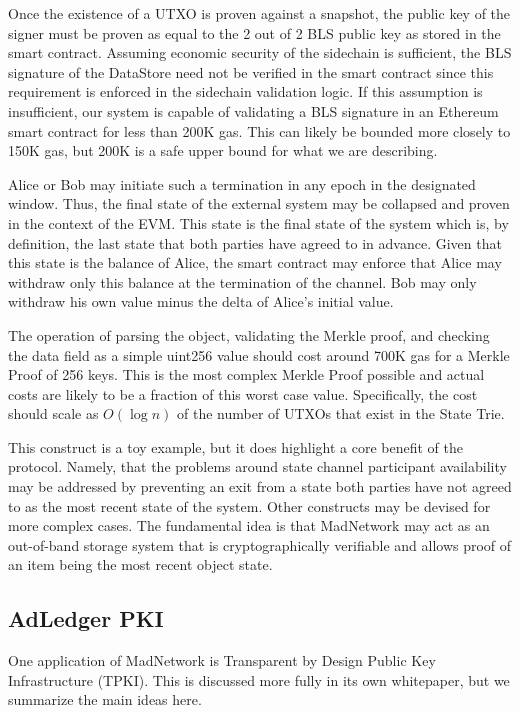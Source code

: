Once the existence of a UTXO is proven against a snapshot, the public
key of the signer must be proven as equal to the 2 out of 2 BLS public
key as stored in the smart contract.
Assuming economic security of the sidechain is sufficient, the BLS
signature of the DataStore need not be verified in the smart contract
since this requirement is enforced in the sidechain validation logic.
If this assumption is insufficient, our system is capable of validating
a BLS signature in an Ethereum smart contract for less than 200K gas.
This can likely be bounded more closely to 150K gas, but 200K is a safe
upper bound for what we are describing.

Alice or Bob may initiate such a termination in any epoch in the
designated window.
Thus, the final state of the external system may be collapsed and
proven in the context of the EVM.
This state is the final state of the system which is, by definition,
the last state that both parties have agreed to in advance.
Given that this state is the balance of Alice, the smart contract may
enforce that Alice may withdraw only this balance at the termination of
the channel.
Bob may only withdraw his own value minus the delta of Alice’s initial
value.

The operation of parsing the object, validating the Merkle proof, and
checking the data field as a simple uint256 value should cost around
700K gas for a Merkle Proof of 256 keys.
This is the most complex Merkle Proof possible and actual costs are
likely to be a fraction of this worst case value.
Specifically, the cost should scale as $O(\log n)$ of the number of UTXOs
that exist in the State Trie.

This construct is a toy example, but it does highlight a core benefit
of the protocol.
Namely, that the problems around state channel participant availability
may be addressed by preventing an exit from a state both parties have
not agreed to as the most recent state of the system.
Other constructs may be devised for more complex cases.
The fundamental idea is that MadNetwork may act as an out-of-band
storage system that is cryptographically verifiable and allows proof of
an item being the most recent object state.

\subsection{AdLedger PKI}

One application of MadNetwork is Transparent by Design Public Key
Infrastructure (TPKI).
This is discussed more fully in its own whitepaper, but we summarize
the main ideas here.

